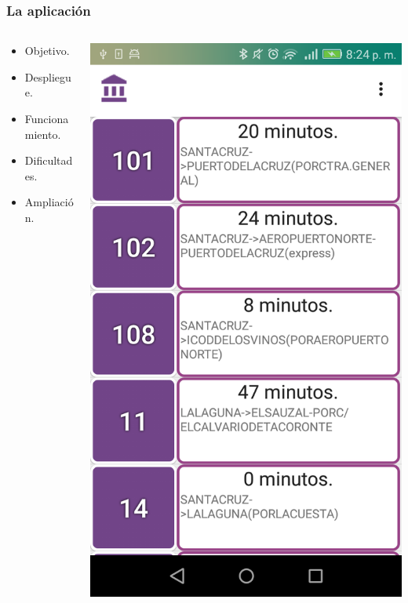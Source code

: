 \begin{frame}
	\frametitle{La aplicación \ULLAR{}}
	\begin{columns}
		\begin{column}{0.6\textwidth}
			\begin{itemize}
				\item Objetivo.
				\item Despliegue.
				\item Funcionamiento.
				\item Dificultades.
				\item Ampliación.
			\end{itemize}
			\endblock{}
		\end{column}
		\begin{column}{0.4\textwidth}
			\vfill 
			\begin{center}
				\includegraphics[width=0.8\linewidth]{Images/App/Autobuses}
			\end{center}
		\end{column}
	\end{columns}
\end{frame}

